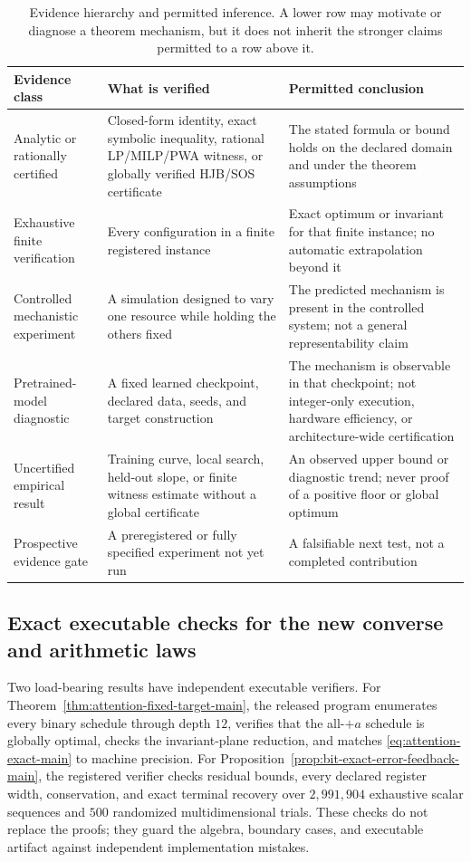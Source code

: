 \documentclass[twoside,11pt]{article}
\begin{document}
\begin{table}[t]
\centering
\caption{Evidence hierarchy and permitted inference.  A lower row may motivate or diagnose a theorem mechanism, but it does not inherit the stronger claims permitted to a row above it.}
\label{tab:evidence-hierarchy}
\small
\begin{tabularx}{\linewidth}{Y{.20\linewidth}Y{.29\linewidth}X}
\toprule
Evidence class & What is verified & Permitted conclusion \\
\midrule
Analytic or rationally certified & Closed-form identity, exact symbolic inequality, rational LP/MILP/PWA witness, or globally verified HJB/SOS certificate & The stated formula or bound holds on the declared domain and under the theorem assumptions \\
Exhaustive finite verification & Every configuration in a finite registered instance & Exact optimum or invariant for that finite instance; no automatic extrapolation beyond it \\
Controlled mechanistic experiment & A simulation designed to vary one resource while holding the others fixed & The predicted mechanism is present in the controlled system; not a general representability claim \\
Pretrained-model diagnostic & A fixed learned checkpoint, declared data, seeds, and target construction & The mechanism is observable in that checkpoint; not integer-only execution, hardware efficiency, or architecture-wide certification \\
Uncertified empirical result & Training curve, local search, held-out slope, or finite witness estimate without a global certificate & An observed upper bound or diagnostic trend; never proof of a positive floor or global optimum \\
Prospective evidence gate & A preregistered or fully specified experiment not yet run & A falsifiable next test, not a completed contribution \\
\bottomrule
\end{tabularx}
\end{table}

\subsection{Exact executable checks for the new converse and arithmetic laws}
\label{sec:exact-verification-main}

Two load-bearing results have independent executable verifiers.  For
Theorem~\ref{thm:attention-fixed-target-main}, the released program enumerates
every binary schedule through depth $12$, verifies that the all-$+a$ schedule
is globally optimal, checks the invariant-plane reduction, and matches
\eqref{eq:attention-exact-main} to machine precision.  For
Proposition~\ref{prop:bit-exact-error-feedback-main}, the registered verifier
checks residual bounds, every declared register width, conservation, and exact
terminal recovery over $2{,}991{,}904$ exhaustive scalar sequences and $500$
randomized multidimensional trials.  These checks do not replace the proofs;
they guard the algebra, boundary cases, and executable artifact against
independent implementation mistakes.
\end{document}
